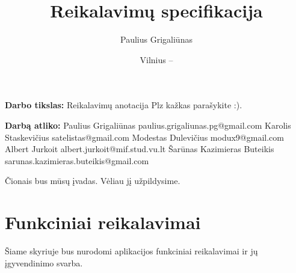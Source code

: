 \documentclass{VUMIFPSkursinis}
\title{Reikalavimų specifikacija}
\author{Paulius Grigaliūnas}
\date{Vilnius – \the\year}
\begin{document}
\maketitle
\cleardoublepage{}
\setcounter{page}{2}



{\bfseries Darbo tikslas:} Reikalavimų anotacija Plz kažkas parašykite :). 
\newline
\newline
\newline

\noindent
{\bfseries Darbą atliko:}
\newline
\newline
\newline
Paulius Grigaliūnas
\newline
paulius.grigaliunas.pg@gmail.com
\newline
\newline
\newline
Karolis Staskevičius
\newline
satelistas@gmail.com
\newline
\newline
\newline
Modestas Dulevičius
\newline
modux9@gmail.com
\newline
\newline
\newline
Albert Jurkoit
\newline
albert.jurkoit@mif.stud.vu.lt
\newline
\newline
\newline
Šarūnas Kazimieras Buteikis
\newline
sarunas.kazimieras.buteikis@gmail.com

\tableofcontents


Čionais bus mūsų įvadas. Vėliau jį užpildysime.
\newline

\section{Funkciniai reikalavimai}

Šiame skyriuje bus nurodomi aplikacijos funkciniai reikalavimai ir jų įgyvendinimo svarba.
\end{document}
